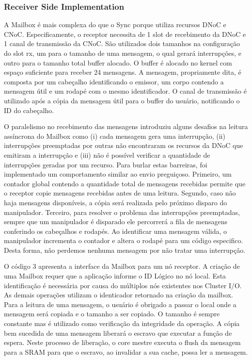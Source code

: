 			\subsubsection{Receiver Side Implementation}

				A Mailbox é mais complexa do que o Sync porque utiliza recursos DNoC e CNoC.
				Especificamente, o receptor necessita de 1 slot de recebimento da DNoC e 1 canal de transmissão da CNoC.
				São utilizados dois tamanhos na configuração do slot rx, um para o tamanho de uma mensagem, o qual gerará interrupções, e outro para o tamanho total buffer alocado.
				O buffer é alocado no kernel com espaço suficiente para receber 24 mensagens.
				A mensagem, propriamente dita, é composta por um cabeçalho identificando o emissor, um corpo contendo a mensagem útil e um rodapé com o mesmo identificador.
				O canal de transmissão é utilizado após a cópia da mensagem útil para o buffer do usuário, notificando o ID do cabeçalho.

				O paralelismo no recebimento das mensagens introduziu alguns desafios na leitura assíncrona do Mailbox como 
				(i) cada mensagem gera uma interrupção,
				(ii) interrupções preemptadas por outras não encontraram os recursos da DNoC que emitiram a interrupção e
				(iii) não é possível verificar a quantidade de interrupções geradas por um recurso.
				Para burlar estas barreiras, foi implementado um comportamento similar ao envio preguiçoso.
				Primeiro, um contador global contendo a quantidade total de mensagens recebidas permite que o receptor copie mensagens recebidas antes de uma leitura.
				Segundo, caso não haja mensagens disponíveis, a cópia será realizada pelo próximo disparo do manipulador.
				Terceiro, para resolver o problema das interrupções preemptadas, sempre que um manipulador é disparado ele percorrerá a fila de mensagens conferindo os cabeçalhos e rodapés.
				Ao identificar uma mensagem válida, o manipulador incrementa o contador e altera o rodapé para um código especifico.
				Desta forma, não perdemos nenhuma mensagem por não tratar uma interrupção.

				O código 3 apresenta a interface da Mailbox para um nó receptor.
				A criação de uma Mailbox requer que a aplicação informe o ID Lógico no nó local.
				Esta identificação é necessária por causa do múltiplos nós existentes nos Cluster I/O.
				As demais operações utilizam o identicador retornado na criação da mailbox.
				Para a leitura de uma mensagem, o usuário é obrigado a passar o local onde a mensagem será copiada e o tamanho a ser copiado.
				O tamanho é sempre constante mas é utilizado como verificação da integridade da operação.
				A cópia bem sucedida de uma mensagem liberará o escravo que executar a função de espera.
				Neste processo de liberação, o core mestre executa o flush da mensagem para a SRAM para que o escravo, ao invalidar a sua cache, possa ler a mensagem.

